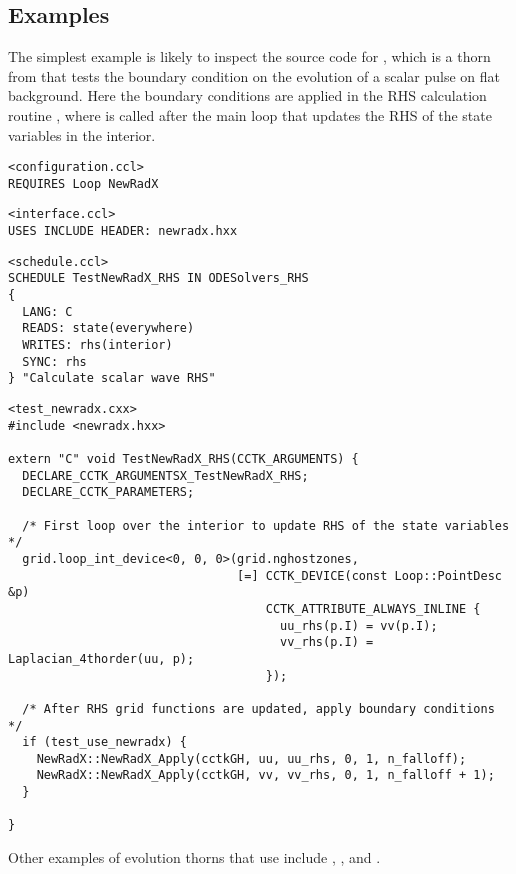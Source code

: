 \subsection{Examples}
The simplest example is likely to inspect the source code for
, which is a thorn from  that tests the
boundary condition on the evolution of a scalar pulse on flat background.
Here the boundary conditions are applied in the RHS calculation routine
, where  is called after the main
loop that updates the RHS of the state variables in the interior.

\begin{verbatim}
<configuration.ccl>
REQUIRES Loop NewRadX
\end{verbatim}

\begin{verbatim}
<interface.ccl>
USES INCLUDE HEADER: newradx.hxx
\end{verbatim}

\begin{verbatim}
<schedule.ccl>
SCHEDULE TestNewRadX_RHS IN ODESolvers_RHS
{
  LANG: C
  READS: state(everywhere)
  WRITES: rhs(interior)
  SYNC: rhs
} "Calculate scalar wave RHS"
\end{verbatim}

\begin{verbatim}
<test_newradx.cxx>
#include <newradx.hxx>

extern "C" void TestNewRadX_RHS(CCTK_ARGUMENTS) {
  DECLARE_CCTK_ARGUMENTSX_TestNewRadX_RHS;
  DECLARE_CCTK_PARAMETERS;

  /* First loop over the interior to update RHS of the state variables */
  grid.loop_int_device<0, 0, 0>(grid.nghostzones,
                                [=] CCTK_DEVICE(const Loop::PointDesc &p)
                                    CCTK_ATTRIBUTE_ALWAYS_INLINE {
                                      uu_rhs(p.I) = vv(p.I);
                                      vv_rhs(p.I) = Laplacian_4thorder(uu, p);
                                    });

  /* After RHS grid functions are updated, apply boundary conditions */
  if (test_use_newradx) {
    NewRadX::NewRadX_Apply(cctkGH, uu, uu_rhs, 0, 1, n_falloff);
    NewRadX::NewRadX_Apply(cctkGH, vv, vv_rhs, 0, 1, n_falloff + 1);
  }

}
\end{verbatim}


Other examples of  evolution thorns that use 
include \cite{SpacetimeX_NewRadX_CanudaX_BSSNMoL},
\cite{SpacetimeX_NewRadX_AsterX}, and
\cite{SpacetimeX_NewRadX_Z4c}.


